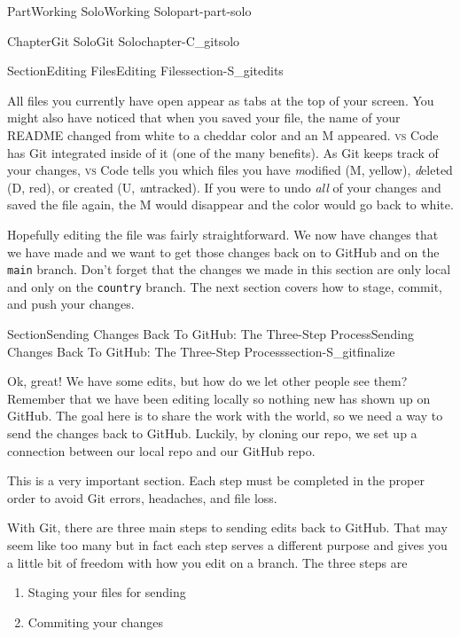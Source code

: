 \documentclass[oneside,10pt,]{book}
\newcommand{\mono}[1]{\texttt{#1}}
\newcommand{\initialism}[1]{\textsc{\MakeLowercase{#1}}}
\begin{document}
\begin{partptx}{Part}{Working Solo}{}{Working Solo}{}{}{part-part-solo}
\begin{chapterptx}{Chapter}{Git Solo}{}{Git Solo}{}{}{chapter-C_gitsolo}
\begin{sectionptx}{Section}{Editing Files}{}{Editing Files}{}{}{section-S_gitedits}
\par
All files you currently have open appear as tabs at the top of your screen. You might also have noticed that when you saved your file, the name of your README changed from white to a cheddar color and an M appeared. \initialism{VS} Code has Git integrated inside of it (one of the many benefits). As Git keeps track of your changes, \initialism{VS} Code tells you which files you have \emph{m}odified (M, yellow), \emph{d}eleted (D, red), or created (U, \emph{u}ntracked). If you were to undo \emph{all} of your changes and saved the file again, the M would disappear and the color would go back to white.%
\par
Hopefully editing the file was fairly straightforward. We now have changes that we have made and we want to get those changes back on to GitHub and on the \mono{main} branch. Don't forget that the changes we made in this section are only local and only on the \mono{country} branch. The next section covers how to stage, commit, and push your changes.%
\end{sectionptx}
%
%
\typeout{************************************************}
\typeout{************************************************}
%
\begin{sectionptx}{Section}{Sending Changes Back To GitHub: The Three-Step Process}{}{Sending Changes Back To GitHub: The Three-Step Process}{}{}{section-S_gitfinalize}
%
%
\begin{introduction}{}%
Ok, great! We have some edits, but how do we let other people see them? Remember that we have been editing locally so nothing new has shown up on GitHub. The goal here is to share the work with the world, so we need a way to send the changes back to GitHub. Luckily, by cloning our repo, we set up a connection between our local repo and our GitHub repo.%
\par
This is a very important section. Each step must be completed in the proper order to avoid Git errors, headaches, and file loss.%
\par
With Git, there are three main steps to sending edits back to GitHub. That may seem like too many but in fact each step serves a different purpose and gives you a little bit of freedom with how you edit on a branch. The three steps are%
\begin{enumerate}
\item{}Staging your files for sending%
\item{}Commiting your changes%

\end{enumerate}
\end{introduction}
\end{sectionptx}
\end{chapterptx}
\end{partptx}
\end{document}
